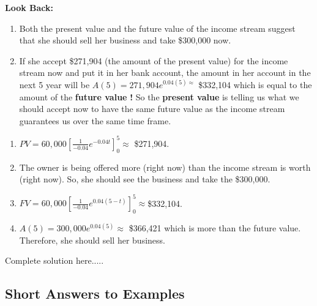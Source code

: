 \begin{example}
\vspace*{\fill}
\noindent \textbf{Look Back:}
\renewcommand{\labelenumi}{\textbf{(\arabic{enumi})}}
\begin{enumerate}[leftmargin=*]
\item Both the present value and the future value of the income stream suggest that she should sell her business and take \$300,000 now.
\item If she accept \$271,904 (the amount of the present value) for the income stream now and put it in her bank account, the amount in her account in the next 5 year will be $A(5)=271,904e^{0.04(5)\approx}$ \$332,104 which is equal to the amount of the \textbf{future value} \textbf{!} So the \textbf{present value} is telling us what we should accept now to have the same future value as the income stream guarantees us over the same time frame.
\end{enumerate}
    \begin{sol}
    \renewcommand{\labelenumi}{\textbf{(\alph{enumi})}}
    \begin{enumerate}[leftmargin=*]
    \item $PV=60,000\left[\displaystyle\frac{1}{-0.04}e^{-0.04t}\right]_0^{5}\approx$ \$271,904. 
    \item The owner is being offered more (right now) than the income stream is worth (right now). So, she should see the business and take the \$300,000.
    \item $FV=60,000\left[\displaystyle\frac{1}{-0.04}e^{0.04(5-t)}\right]_0^{5}\approx $\$332,104.
    \item $A(5)=300,000e^{0.04(5)}\approx$ \$366,421 which is more than the future value. Therefore, she should sell her business.
    \end{enumerate}
    \end{sol}
    \begin{solL}
    Complete solution here.....
    
    \end{solL}
    
\end{example}






\subsection*{Short Answers to Examples}





